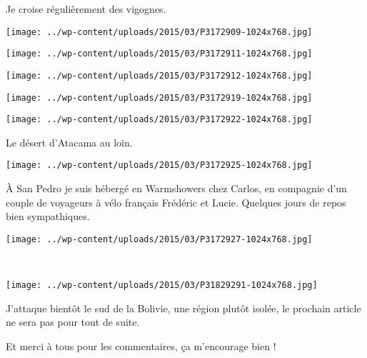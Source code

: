  Je croise régulièrement des vigognes.
\begin{center} \texttt{[image: ../wp-content/uploads/2015/03/P3172909-1024x768.jpg]} \end{center}
\begin{center} \texttt{[image: ../wp-content/uploads/2015/03/P3172911-1024x768.jpg]} \end{center}
\begin{center} \texttt{[image: ../wp-content/uploads/2015/03/P3172912-1024x768.jpg]} \end{center}
\begin{center} \texttt{[image: ../wp-content/uploads/2015/03/P3172919-1024x768.jpg]} \end{center}
\vfill
\begin{center} \texttt{[image: ../wp-content/uploads/2015/03/P3172922-1024x768.jpg]} \end{center}
\vspace{-\topsep}
\vspace{-0.75mm}

\pagebreak
 Le désert d'Atacama au loin. 
\begin{center} \texttt{[image: ../wp-content/uploads/2015/03/P3172925-1024x768.jpg]} \end{center}

 \`A San Pedro je suis hébergé en Warmshowers chez Carlos, en compagnie d'un couple de voyageurs à vélo français Frédéric et Lucie. Quelques jours de repos bien sympathiques. 
\begin{center} \texttt{[image: ../wp-content/uploads/2015/03/P3172927-1024x768.jpg]} \end{center}
\vspace{-\topsep}
\pagebreak
~
\vspace{3mm}
\begin{center} \texttt{[image: ../wp-content/uploads/2015/03/P31829291-1024x768.jpg]} \end{center}

J'attaque bientôt le sud de la Bolivie, une région plutôt isolée, le prochain article ne sera pas pour tout de suite.

 Et merci à tous pour les commentaires, ça m'encourage bien !
